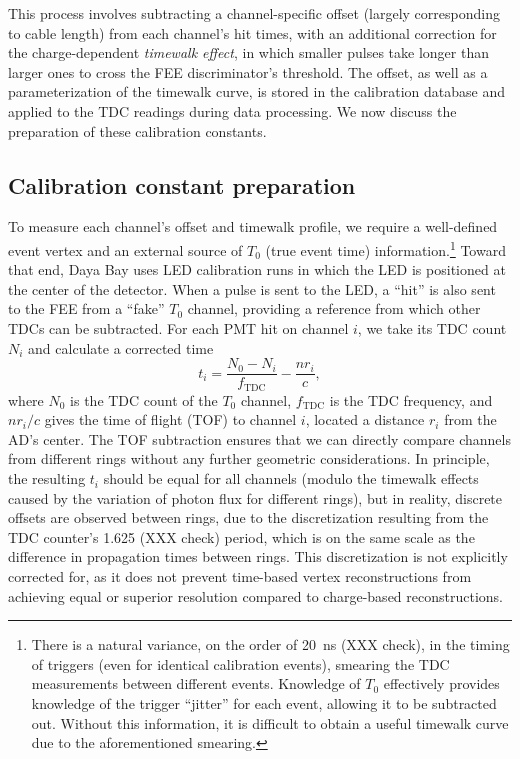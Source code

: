 \documentclass[../thesis.tex]{subfiles}
\begin{document}
This process involves subtracting a channel-specific offset (largely corresponding to cable length) from each channel's hit times, with an additional correction for the charge-dependent \emph{timewalk effect}, in which smaller pulses take longer than larger ones to cross the FEE discriminator's threshold. The offset, as well as a parameterization of the timewalk curve, is stored in the calibration database and applied to the TDC readings during data processing. We now discuss the preparation of these calibration constants.

\subsection{Calibration constant preparation}

To measure each channel's offset and timewalk profile, we require a well-defined event vertex and an external source of $T_0$ (true event time) information.\footnote{There is a natural variance, on the order of 20~ns (XXX check), in the timing of triggers (even for identical calibration events), smearing the TDC measurements between different events. Knowledge of $T_0$ effectively provides knowledge of the trigger ``jitter'' for each event, allowing it to be subtracted out. Without this information, it is difficult to obtain a useful timewalk curve due to the aforementioned smearing.} Toward that end, Daya Bay uses LED calibration runs in which the LED is positioned at the center of the detector. When a pulse is sent to the LED, a ``hit'' is also sent to the FEE from a ``fake'' $T_0$ channel, providing a reference from which other TDCs can be subtracted. For each PMT hit on channel $i$, we take its TDC count $N_i$ and calculate a corrected time
\begin{equation*}
  t_i = \frac{N_0 - N_i}{f_\mathrm{TDC}} - \frac{n r_i}{c},  
\end{equation*}
where $N_0$ is the TDC count of the $T_0$ channel, $f_\mathrm{TDC}$ is the TDC frequency, and $nr_i/c$ gives the time of flight (TOF) to channel $i$, located a distance $r_i$ from the AD's center. The TOF subtraction ensures that we can directly compare channels from different rings without any further geometric considerations. In principle, the resulting $t_i$ should be equal for all channels (modulo the timewalk effects caused by the variation of photon flux for different rings), but in reality, discrete offsets are observed between rings, due to the discretization resulting from the TDC counter's 1.625 (XXX check) period, which is on the same scale as the difference in propagation times between rings. This discretization is not explicitly corrected for, as it does not prevent time-based vertex reconstructions from achieving equal or superior resolution compared to charge-based reconstructions.
\end{document}
